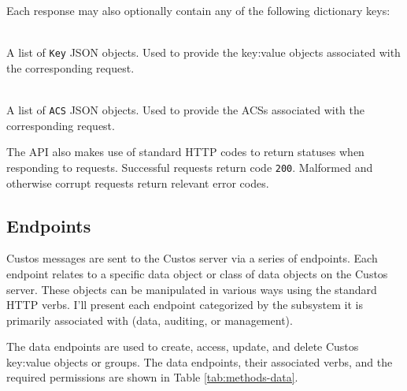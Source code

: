 \noindent
Each response may also optionally contain any of the following
dictionary keys:

\begin{packed_desc}
\item[\texttt{Keys}] \hfill \\ A list of \texttt{Key} JSON
  objects. Used to provide the key:value objects associated with the
  corresponding request.
\item[\texttt{ACSs}] \hfill \\ A list of \texttt{ACS} JSON
  objects. Used to provide the ACSs associated with the corresponding
  request.
\end{packed_desc}

The API also makes use of standard HTTP codes to return statuses when
responding to requests. Successful requests return code
\texttt{200}. Malformed and otherwise corrupt requests return relevant
error codes.

\subsection{Endpoints}

Custos messages are sent to the Custos server via a series of
endpoints. Each endpoint relates to a specific data object or class
of data objects on the Custos server. These objects can be manipulated
in various ways using the standard HTTP verbs. I'll present each
endpoint categorized by the subsystem it is primarily associated with
(data, auditing, or management).

The data endpoints are used to create, access, update, and delete
Custos key:value objects or groups. The data endpoints, their
associated verbs, and the required permissions are shown in Table
\ref{tab:methods-data}.

